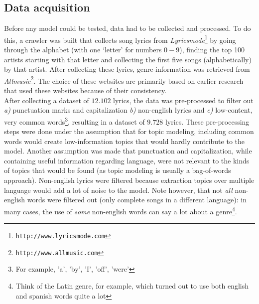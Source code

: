 \subsection{Data acquisition}\label{sub:prep}
Before any model could be tested, data had to be collected and processed. To do this, a crawler was built that collects song lyrics from \textit{Lyricsmode}\footnote{\texttt{http://www.lyricsmode.com}} by going through the alphabet (with one `letter' for numbers $0-9$), finding the top 100 artists starting with that letter and collecting the first five songs (alphabetically) by that artist. After collecting these lyrics, genre-information was retrieved from \textit{Allmusic}\footnote{\texttt{http://www.allmusic.com}}. The choice of these websites are primarily based on earlier research \cite{felllyrics} that used these websites because of their consistency. \\
After collecting a dataset of $12.102$ lyrics, the data was pre-processed to filter out \textit{a)} punctuation marks and capitalization \textit{b)} non-english lyrics and \textit{c)} low-content, very common words\footnote{For example, 'a', 'by', 'I', 'off', 'were'}, resulting in a dataset of $9.728$ lyrics. These pre-processing steps were done under the assumption that for topic modeling, including common words would create low-information topics that would hardly contribute to the model. Another assumption was made that punctuation and capitalization, while containing useful information regarding language, were not relevant to the kinds of topics that would be found (as topic modeling is usually a bag-of-words approach). Non-english lyrics were filtered because extraction topics over multiple language would add a lot of noise to the model. Note however, that not \textit{all} non-english words were filtered out (only complete songs in a different language): in many cases, the use of \textit{some} non-english words can say a lot about a genre\footnote{Think of the Latin genre, for example, which turned out to use both english and spanish words quite a lot}. 

